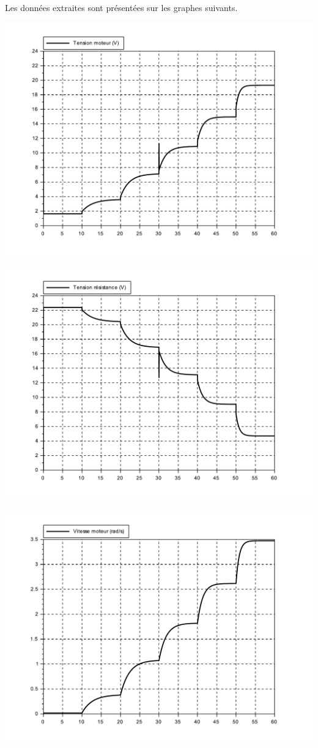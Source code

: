 ~\

Les données extraites sont présentées sur les graphes suivants.

\begin{center}
	\includegraphics[width=0.9\linewidth]{img/Tension_moteur}
\end{center}

\begin{center}
	\includegraphics[width=0.9\linewidth]{img/Tension_resistance}
\end{center}

\begin{center}
	\includegraphics[width=0.9\linewidth]{img/Vitesse_moteur}
\end{center}

